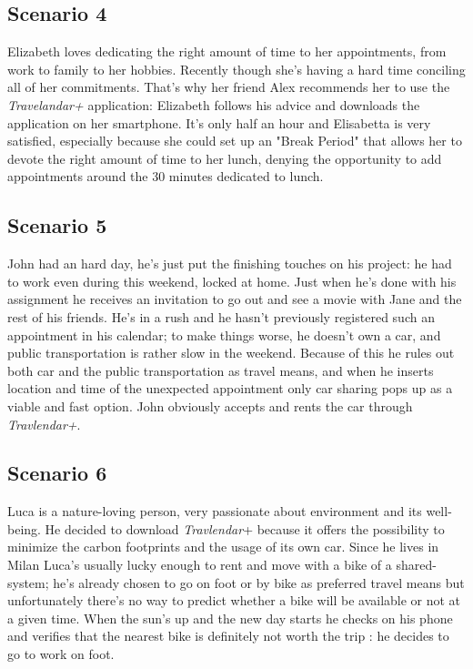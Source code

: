 \subsection*{Scenario 4}

Elizabeth loves dedicating the right amount of time to her appointments, from work to family to her hobbies. Recently though she’s having a hard time conciling all of her commitments.
That’s why her friend Alex recommends her to use the \textit{Travelandar+} application: Elizabeth follows his advice and downloads the application on her smartphone.
It’s only half an hour and Elisabetta is very satisfied, especially because she could set up an "Break Period" that allows her to devote the right amount of time to her lunch, denying the opportunity to add appointments around the 30 minutes dedicated to lunch.

\subsection*{Scenario 5}

John had an hard day, he’s just put the finishing touches on his project: he had to work even during this weekend, locked at home. Just when he’s done with his assignment he receives an invitation to go out and see a movie with Jane and the rest of his friends.
He’s in a rush and he hasn’t previously registered such an appointment in his calendar; to make things worse, he doesn’t own a car, and public transportation is rather slow in the weekend.
Because of this he rules out both car and the public transportation as travel means, and when he inserts location and time of the unexpected appointment only car sharing pops up as a viable and fast option.
John obviously accepts and rents the car through \textit{Travlendar+}.

\subsection*{Scenario 6}

Luca is a nature-loving person, very passionate about environment and its well-being.
He decided to download \textit{Travlendar}+ because it offers the possibility to minimize the carbon footprints and the usage of its own car.
Since he lives in Milan Luca’s usually lucky enough to rent and move with a bike of a shared-system; he’s already chosen to go on foot or by bike as preferred travel means but unfortunately there’s no way to predict whether a bike will be available or not at a given time.
When the sun’s up and the new day starts he checks on his phone and verifies that the nearest bike is definitely not worth the trip : he decides to go to work on foot.


